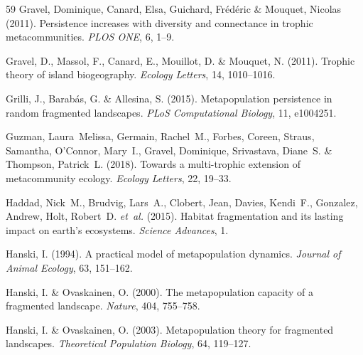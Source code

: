 \documentclass[11pt]{article}
\begin{document}
\begin{thebibliography}{59}
Gravel, Dominique, Canard, Elsa, Guichard, Frédéric \& Mouquet, Nicolas
  (2011{}).
\newblock Persistence increases with diversity and connectance in trophic
  metacommunities.
\newblock \emph{PLOS ONE}, 6, 1--9.

Gravel, D., Massol, F., Canard, E., Mouillot, D. \& Mouquet, N.
  (2011{}).
\newblock Trophic theory of island biogeography.
\newblock \emph{Ecology Letters}, 14, 1010--1016.

Grilli, J., Barab\'{a}s, G. \& Allesina, S. (2015).
\newblock Metapopulation persistence in random fragmented landscapes.
\newblock \emph{PLoS Computational Biology}, 11, e1004251.

Guzman, Laura~Melissa, Germain, Rachel~M., Forbes, Coreen, Straus, Samantha,
  O'Connor, Mary~I., Gravel, Dominique, Srivastava, Diane~S. \& Thompson,
  Patrick~L. (2018).
\newblock Towards a multi-trophic extension of metacommunity ecology.
\newblock \emph{Ecology Letters}, 22, 19--33.

Haddad, Nick~M., Brudvig, Lars~A., Clobert, Jean, Davies, Kendi~F., Gonzalez,
  Andrew, Holt, Robert~D. \emph{et~al.} (2015).
\newblock Habitat fragmentation and its lasting impact on
  earth{\textquoteright}s ecosystems.
\newblock \emph{Science Advances}, 1.

Hanski, I. (1994).
\newblock A practical model of metapopulation dynamics.
\newblock \emph{Journal of Animal Ecology}, 63, 151--162.

Hanski, I. \& Ovaskainen, O. (2000).
\newblock The metapopulation capacity of a fragmented landscape.
\newblock \emph{Nature}, 404, 755--758.

Hanski, I. \& Ovaskainen, O. (2003).
\newblock Metapopulation theory for fragmented landscapes.
\newblock \emph{Theoretical Population Biology}, 64, 119--127.


\end{thebibliography}
\end{document}
